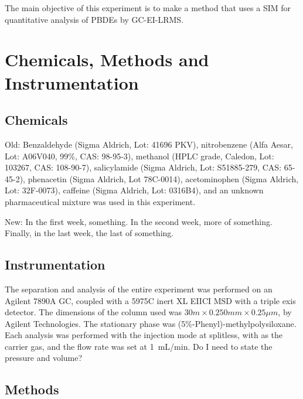 \documentclass[a4paper, 12pt]{article}
\begin{document}
The main objective of this experiment is to make a method that uses a SIM for quantitative analysis of PBDEs by GC-EI-LRMS.


\section{Chemicals, Methods and Instrumentation}

\subsection{Chemicals}
Old: Benzaldehyde (Sigma Aldrich, Lot: 41696 PKV), nitrobenzene (Alfa Aesar, Lot: A06V040, 99\%, CAS: 98-95-3), methanol (HPLC grade, Caledon, Lot: 103267, CAS: 108-90-7), salicylamide (Sigma Aldrich, Lot: S51885-279, CAS: 65-45-2), phenacetin (Sigma Aldrich, Lot 78C-0014), acetominophen (Sigma Aldrich, Lot: 32F-0073), caffeine (Sigma Aldrich, Lot: 0316B4), and an unknown pharmaceutical mixture was used in this experiment.

New: In the first week, something. In the second week, more of something. Finally, in the last week, the last of something.

\subsection{Instrumentation}
The separation and analysis of the entire experiment was performed on an Agilent 7890A GC, coupled with a 5975C inert XL EIICI MSD with a triple exis detector. The dimensions of the column used was $30m \times 0.250mm \times 0.25\mu{}m$, by Agilent Technologies. The stationary phase was (5\%-Phenyl)-methylpolysiloxane. Each analysis was performed with the injection mode at splitless, with  as the carrier gas, and the flow rate was set at \SI{1}{mL/min}. Do I need to state the pressure and volume?

\subsection{Methods}

\end{document}
